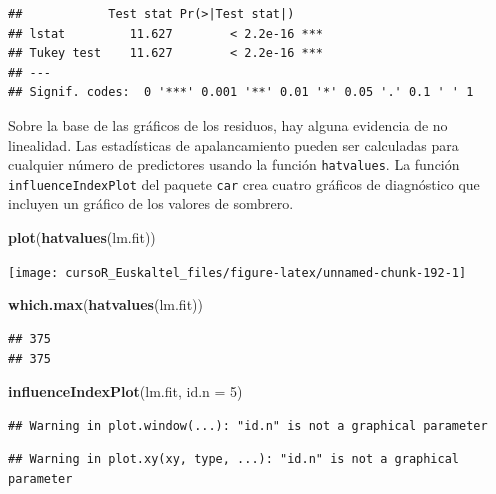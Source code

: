 \documentclass[]{book}
\newenvironment{Shaded}{\begin{snugshade}}{\end{snugshade}}
\newcommand{\KeywordTok}[1]{\textcolor[rgb]{0.13,0.29,0.53}{\textbf{#1}}}
\newcommand{\DataTypeTok}[1]{\textcolor[rgb]{0.13,0.29,0.53}{#1}}
\newcommand{\DecValTok}[1]{\textcolor[rgb]{0.00,0.00,0.81}{#1}}
\newcommand{\NormalTok}[1]{#1}
\begin{document}
\begin{verbatim}
##            Test stat Pr(>|Test stat|)    
## lstat         11.627        < 2.2e-16 ***
## Tukey test    11.627        < 2.2e-16 ***
## ---
## Signif. codes:  0 '***' 0.001 '**' 0.01 '*' 0.05 '.' 0.1 ' ' 1
\end{verbatim}

Sobre la base de las gráficos de los residuos, hay alguna evidencia de
no linealidad. Las estadísticas de apalancamiento pueden ser calculadas
para cualquier número de predictores usando la función
\texttt{hatvalues}. La función \texttt{influenceIndexPlot} del paquete
\texttt{car} crea cuatro gráficos de diagnóstico que incluyen un gráfico
de los valores de sombrero.

\begin{Shaded}
\begin{Highlighting}[]
\KeywordTok{plot}\NormalTok{(}\KeywordTok{hatvalues}\NormalTok{(lm.fit))}
\end{Highlighting}
\end{Shaded}

\begin{center}\texttt{[image: cursoR\_Euskaltel\_files/figure-latex/unnamed-chunk-192-1]} \end{center}

\begin{Shaded}
\begin{Highlighting}[]
\KeywordTok{which.max}\NormalTok{(}\KeywordTok{hatvalues}\NormalTok{(lm.fit))}
\end{Highlighting}
\end{Shaded}

\begin{verbatim}
## 375 
## 375
\end{verbatim}

\begin{Shaded}
\begin{Highlighting}[]
\KeywordTok{influenceIndexPlot}\NormalTok{(lm.fit, }\DataTypeTok{id.n =} \DecValTok{5}\NormalTok{)}
\end{Highlighting}
\end{Shaded}

\begin{verbatim}
## Warning in plot.window(...): "id.n" is not a graphical parameter
\end{verbatim}

\begin{verbatim}
## Warning in plot.xy(xy, type, ...): "id.n" is not a graphical parameter
\end{verbatim}
\end{document}
